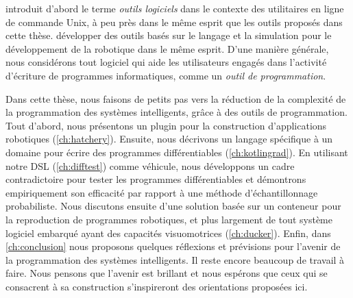 %
%
\citet{kernighan1976software} introduit d'abord le terme \textit{outils logiciels} dans le contexte des utilitaires en ligne de commande Unix, à peu près dans le même esprit que les outils proposés dans cette thèse. \citet{thrun2000towards, erez2015simulation} développer des outils basés sur le langage et la simulation pour le développement de la robotique dans le même esprit. D'une manière générale, nous considérons tout logiciel qui aide les utilisateurs engagés dans l'activité d'écriture de programmes informatiques, comme un \textit{outil de programmation}.

Dans cette thèse, nous faisons de petits pas vers la réduction de la complexité de la programmation des systèmes intelligents, grâce à des outils de programmation. Tout d'abord, nous présentons un plugin pour la construction d'applications robotiques (\autoref{ch:hatchery}). Ensuite, nous décrivons un langage spécifique à un domaine pour écrire des programmes différentiables (\autoref{ch:kotlingrad}). En utilisant notre DSL (\autoref{ch:difftest}) comme véhicule, nous développons un cadre contradictoire pour tester les programmes différentiables et démontrons empiriquement son efficacité par rapport à une méthode d'échantillonnage probabiliste. Nous discutons ensuite d'une solution basée sur un conteneur pour la reproduction de programmes robotiques, et plus largement de tout système logiciel embarqué ayant des capacités visuomotrices (\autoref{ch:ducker}). Enfin, dans \autoref{ch:conclusion} nous proposons quelques réflexions et prévisions pour l'avenir de la programmation des systèmes intelligents. Il reste encore beaucoup de travail à faire. Nous pensons que l'avenir est brillant et nous espérons que ceux qui se consacrent à sa construction s'inspireront des orientations proposées ici.

